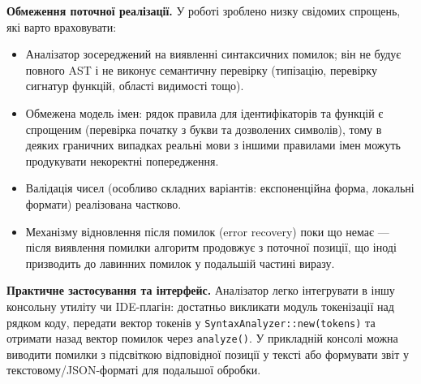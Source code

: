 \documentclass[14pt, a4paper]{extreport}
\begin{document}
	\textbf{Обмеження поточної реалізації.} У роботі зроблено низку свідомих спрощень, які варто враховувати:
	\begin{itemize}[noitemsep, nolistsep]
		\item Аналізатор зосереджений на виявленні синтаксичних помилок; він не будує повного AST і не виконує семантичну перевірку (типізацію, перевірку сигнатур функцій, області видимості тощо).
		\item Обмежена модель імен: рядок правила для ідентифікаторів та функцій є спрощеним (перевірка початку з букви та дозволених символів), тому в деяких граничних випадках реальні мови з іншими правилами імен можуть продукувати некоректні попередження.
		\item Валідація чисел (особливо складних варіантів: експоненційна форма, локальні формати) реалізована частково.
		\item Механізму відновлення після помилок (error recovery) поки що немає — після виявлення помилки алгоритм продовжує з поточної позиції, що іноді призводить до лавинних помилок у подальшій частині виразу.
	\end{itemize}
	
	\bigskip
	
	\textbf{Практичне застосування та інтерфейс.} Аналізатор легко інтегрувати в іншу консольну утиліту чи IDE-плагін: достатньо викликати модуль токенізації над рядком коду, передати вектор токенів у \texttt{SyntaxAnalyzer::new(tokens)} та отримати назад вектор помилок через \texttt{analyze()}. У прикладній консолі можна виводити помилки з підсвіткою відповідної позиції у тексті або формувати звіт у текстовому/JSON-форматі для подальшої обробки.
	
	\bigskip
	
\end{document}

